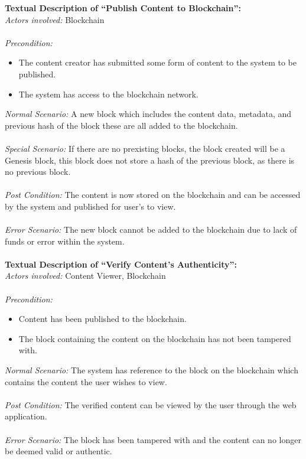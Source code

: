 \noindent
\textbf{Textual Description of “Publish Content to Blockchain”:} \\
\textit{Actors involved:} Blockchain  \\ \\
\textit{Precondition:} 
	\begin{itemize}
		\item The content creator has submitted some form of content to the system to be published.
		\item The system has access to the blockchain network. 
	\end{itemize}
\textit{Normal Scenario:} A new block which includes the content data, metadata, and previous hash of the block
						  these are all added to the blockchain. \\ \\
\textit{Special Scenario:} If there are no prexisting blocks, the block created will be a Genesis block,
						   this block does not store a hash of the previous block, as there is no previous block. \\ \\
\textit{Post Condition:} The content is now stored on the blockchain and can be accessed by the system 
						 and published for user’s to view. \\ \\
\textit{Error Scenario:} The new block cannot be added to the blockchain due to lack of funds 
						 or error within the system. \\ \\

\noindent
\textbf{Textual Description of “Verify Content's Authenticity”:} \\
\textit{Actors involved:} Content Viewer, Blockchain \\ \\
\textit{Precondition:} 
	\begin{itemize}
		\item Content has been published to the blockchain.
		\item The block containing the content on the blockchain has not been tampered with.
	\end{itemize}
\textit{Normal Scenario:} The system has reference to the block on the blockchain which 
						  contains the content the user wishes to view. \\ \\
\textit{Post Condition:} The verified content can be viewed by the user through the web application. \\ \\
\textit{Error Scenario:} The block has been tampered with and the content can no longer be deemed valid or authentic. \\ \\

